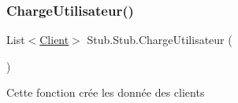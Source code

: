 \mbox{\label{classStub_1_1Stub_a8ca776ea5519f9b5f880221f725ee305}} 
\subsubsection{\texorpdfstring{Charge\+Utilisateur()}{ChargeUtilisateur()}}
{\footnotesize\ttfamily List$<$\hyperlink{classModele_1_1Client}{Client}$>$ Stub.\+Stub.\+Charge\+Utilisateur (\begin{DoxyParamCaption}{ }\end{DoxyParamCaption})\hspace{0.3cm}{\ttfamily [inline]}}



Cette fonction crée les donnée des clients 


